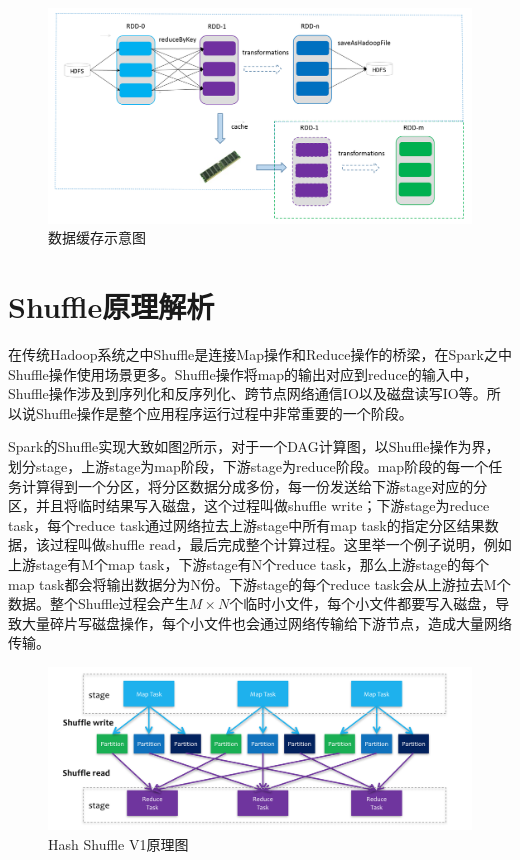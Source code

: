 \begin{figure}
    \centering
    \includegraphics[width=1\textwidth]{Img/rdd-cache.png}
    \caption{数据缓存示意图}
    \label{fig:rdd-cache}
\end{figure}

\section{Shuffle原理解析}

在传统Hadoop系统之中Shuffle是连接Map操作和Reduce操作的桥梁，在Spark之中Shuffle操作使用场景更多。Shuffle操作将map的输出对应到reduce的输入中，Shuffle操作涉及到序列化和反序列化、跨节点网络通信IO以及磁盘读写IO等。所以说Shuffle操作是整个应用程序运行过程中非常重要的一个阶段。

Spark的Shuffle实现大致如图\ref{fig:shuffle-overview}所示，对于一个DAG计算图，以Shuffle操作为界，划分stage，上游stage为map阶段，下游stage为reduce阶段。map阶段的每一个任务计算得到一个分区，将分区数据分成多份，每一份发送给下游stage对应的分区，并且将临时结果写入磁盘，这个过程叫做shuffle write；下游stage为reduce task，每个reduce task通过网络拉去上游stage中所有map task的指定分区结果数据，该过程叫做shuffle read，最后完成整个计算过程。这里举一个例子说明，例如上游stage有M个map task，下游stage有N个reduce task，那么上游stage的每个map task都会将输出数据分为N份。下游stage的每个reduce task会从上游拉去M个数据。整个Shuffle过程会产生$M \times N$个临时小文件，每个小文件都要写入磁盘，导致大量碎片写磁盘操作，每个小文件也会通过网络传输给下游节点，造成大量网络传输。

\begin{figure}
    \centering
    \includegraphics[width=1\textwidth]{Img/spark-shuffle-overview.png}
    \caption{Hash Shuffle V1原理图}
    \label{fig:shuffle-overview}
\end{figure}

